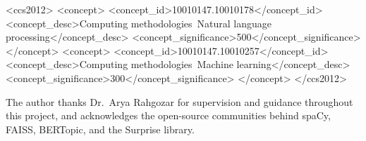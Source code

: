 \documentclass[sigplan,screen]{acmart}
\begin{document}
\begin{CCSXML}
<ccs2012>
 <concept>
  <concept_id>10010147.10010178</concept_id>
  <concept_desc>Computing methodologies~Natural language processing</concept_desc>
  <concept_significance>500</concept_significance>
 </concept>
 <concept>
  <concept_id>10010147.10010257</concept_id>
  <concept_desc>Computing methodologies~Machine learning</concept_desc>
  <concept_significance>300</concept_significance>
 </concept>
</ccs2012>
\end{CCSXML}




\maketitle













\begin{acks}
The author thanks Dr.\ Arya Rahgozar for supervision and guidance throughout
this project, and acknowledges the open-source communities behind spaCy,
FAISS, BERTopic, and the Surprise library.
\end{acks}
\end{document}

